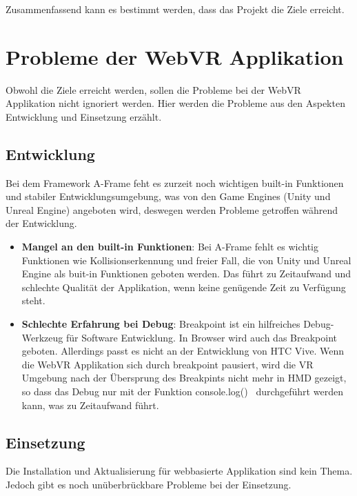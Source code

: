 Zusammenfassend kann es bestimmt werden, dass das Projekt die Ziele erreicht.

\section{Probleme der WebVR Applikation}
Obwohl die Ziele erreicht werden, sollen die Probleme bei der WebVR Applikation nicht ignoriert werden. Hier werden die Probleme aus den Aspekten Entwicklung und Einsetzung erzählt.

\subsection{Entwicklung}

Bei dem Framework A-Frame feht es zurzeit noch wichtigen built-in Funktionen und stabiler Entwicklungsumgebung, was von den Game Engines (Unity und Unreal Engine) angeboten wird, deswegen werden Probleme getroffen während der Entwicklung. 

\begin{itemize}
    \item \textbf{Mangel an den built-in Funktionen}: Bei A-Frame fehlt es wichtig Funktionen wie Kollisionserkennung und freier Fall, die von Unity und Unreal Engine als buit-in Funktionen geboten werden. Das führt zu Zeitaufwand und schlechte Qualität der Applikation, wenn keine genügende Zeit zu Verfügung steht.
    
    \item \textbf{Schlechte Erfahrung bei Debug}: Breakpoint ist ein hilfreiches Debug-Werkzeug für Software Entwicklung. In Browser wird auch das Breakpoint geboten. Allerdings passt es nicht an der Entwicklung von HTC Vive. Wenn die WebVR Applikation sich durch breakpoint pausiert, wird die VR Umgebung nach der Übersprung des Breakpints nicht mehr in HMD gezeigt, so dass das Debug nur mit der Funktion \glqq console.log() \grqq\ durchgeführt werden kann, was zu Zeitaufwand führt.
    
\end{itemize}

\subsection{Einsetzung}

Die Installation und Aktualisierung für webbasierte Applikation sind kein Thema. Jedoch gibt es noch unüberbrückbare Probleme bei der Einsetzung.

